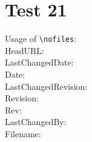 \documentclass[12pt]{report}
\begin{document}
\chapter{Test 21}
Usage of \verb+\nofiles+:\\

\noindent
HeadURL:  \\
LastChangedDate:  \\
Date:  \\
LastChangedRevision:  \\
Revision:  \\
Rev:  \\
LastChangedBy:  \\
Filename:  \\

\end{document}
